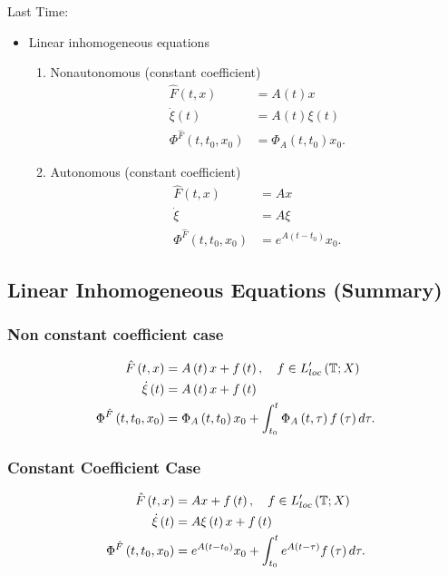 
Last Time:
\begin{itemize}
	\item Linear inhomogeneous equations
		\begin{enumerate}
			\item Nonautonomous (constant coefficient)
				\begin{align*}
					\hat{F}\left( t, x \right)  &=  A\left( t \right) x \\
					\dot{\xi} \left( t \right) &= A\left( t \right) \xi\left( t \right) \\
					\Phi ^{\hat{F}}\left( t, t_0, x_0 \right) &= \Phi_{A}\left( t, t_0 \right) x_0 
				.\end{align*}
			\item Autonomous (constant coefficient)
				\begin{align*}
					\hat{F}\left( t, x \right)  &=  A x \\
					\dot{\xi}  &= A \xi \\
					\Phi ^{\hat{F}}\left( t, t_0, x_0 \right) &= e^{A\left( t - t_0 \right) }x_0
				.\end{align*}
		\end{enumerate}
\end{itemize}

\subsection{Linear Inhomogeneous Equations (Summary)}
\subsubsection{Non constant coefficient case}

\begin{align*}
	\hat{F}\left( t, x \right) &=  A\left( t \right) x + f\left( t \right) , \quad f \in  L'_{loc}\left( \mathbb{T}; X \right)  \\
	\dot{\xi} \left( t \right)  &=  A\left( t \right) x + f\left( t \right)  \\
	\Phi^{\hat{F}}\left( t, t_0, x_0 \right)  &= \Phi_{A}\left( t, t_0 \right) x_0 + \int_{t_0}^{t} \Phi_{A} \left( t, \tau \right) f\left( \tau \right) d\tau 
.\end{align*}

\subsubsection{Constant Coefficient Case}
\begin{align*}
	\hat{F}\left( t, x \right) &=  A x + f\left( t \right) , \quad f \in  L'_{loc}\left( \mathbb{T}; X \right)  \\
	\dot{\xi} \left( t \right)  &=  A\xi\left( t \right) x + f\left( t \right)  \\
	\Phi^{\hat{F}}\left( t, t_0, x_0 \right)  &= e^{A\left( t - t_0 \right)} x_0 + \int_{t_0}^{t} e^{A \left( t - \tau \right)} f\left( \tau \right) d\tau 
.\end{align*}

